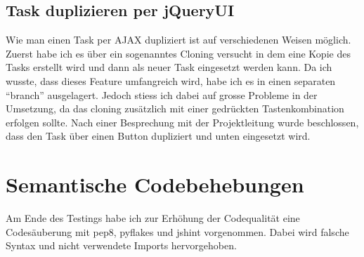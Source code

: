 \subsection{Task duplizieren per jQueryUI}
Wie man einen Task per AJAX dupliziert ist auf verschiedenen Weisen möglich.\\
Zuerst habe ich es über ein sogenanntes Cloning versucht in dem eine Kopie des Tasks erstellt wird und dann als neuer Task eingesetzt werden kann.
Da ich wusste, dass dieses Feature umfangreich wird, habe ich es in einen separaten ``branch'' ausgelagert.
Jedoch stiess ich dabei auf grosse Probleme in der Umsetzung, da das cloning zusätzlich mit einer gedrückten Tastenkombination erfolgen sollte.
Nach einer Besprechung mit der Projektleitung wurde beschlossen, dass den Task über einen Button dupliziert und unten eingesetzt wird.
\section{Semantische Codebehebungen}
Am Ende des Testings habe ich zur Erhöhung der Codequalität eine Codesäuberung mit pep8, pyflakes und jshint vorgenommen. Dabei wird falsche Syntax und
nicht verwendete Imports hervorgehoben.
